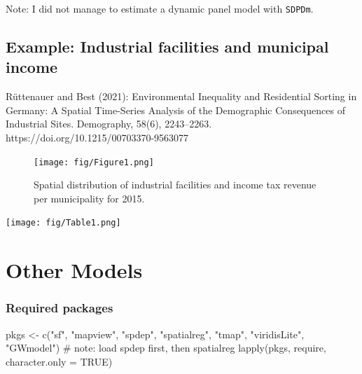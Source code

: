 \documentclass[
  letterpaper,
]{scrbook}
\newenvironment{Shaded}{\begin{snugshade}}{\end{snugshade}}
\newcommand{\AttributeTok}[1]{\textcolor[rgb]{0.40,0.45,0.13}{#1}}
\newcommand{\CommentTok}[1]{\textcolor[rgb]{0.37,0.37,0.37}{#1}}
\newcommand{\ConstantTok}[1]{\textcolor[rgb]{0.56,0.35,0.01}{#1}}
\newcommand{\FunctionTok}[1]{\textcolor[rgb]{0.28,0.35,0.67}{#1}}
\newcommand{\NormalTok}[1]{\textcolor[rgb]{0.00,0.23,0.31}{#1}}
\newcommand{\OtherTok}[1]{\textcolor[rgb]{0.00,0.23,0.31}{#1}}
\newcommand{\StringTok}[1]{\textcolor[rgb]{0.13,0.47,0.30}{#1}}
\begin{document}
Note: I did not manage to estimate a dynamic panel model with
\texttt{SDPDm}.

\hypertarget{example-industrial-facilities-and-municipal-income}{%
\section{Example: Industrial facilities and municipal
income}\label{example-industrial-facilities-and-municipal-income}}

Rüttenauer and Best (2021): Environmental Inequality and Residential
Sorting in Germany: A Spatial Time-Series Analysis of the Demographic
Consequences of Industrial Sites. Demography, 58(6), 2243--2263.
https://doi.org/10.1215/00703370-9563077

\begin{figure}

{\centering \texttt{[image: fig/Figure1.png]}

}

\caption{Spatial distribution of industrial facilities and income tax
revenue per municipality for 2015.}

\end{figure}

\texttt{[image: fig/Table1.png]}


\hypertarget{other-models}{%
\chapter{Other Models}\label{other-models}}

\newcommand{\Prob}{\mathrm{Prob}}

\hypertarget{required-packages-12}{%
\subsection{Required packages}\label{required-packages-12}}

\begin{Shaded}
\begin{Highlighting}[]
\NormalTok{pkgs }\OtherTok{\textless{}{-}} \FunctionTok{c}\NormalTok{(}\StringTok{"sf"}\NormalTok{, }\StringTok{"mapview"}\NormalTok{, }\StringTok{"spdep"}\NormalTok{, }\StringTok{"spatialreg"}\NormalTok{, }\StringTok{"tmap"}\NormalTok{, }\StringTok{"viridisLite"}\NormalTok{, }\StringTok{"GWmodel"}\NormalTok{) }\CommentTok{\# note: load spdep first, then spatialreg}
\FunctionTok{lapply}\NormalTok{(pkgs, require, }\AttributeTok{character.only =} \ConstantTok{TRUE}\NormalTok{)}
\end{Highlighting}
\end{Shaded}
\end{document}
